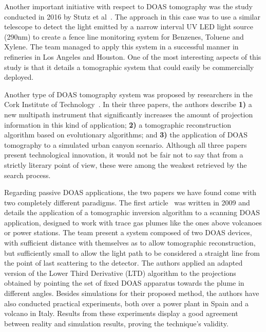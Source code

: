 Another important initiative with respect to \gls{DOAS} tomography was
the study conducted in 2016 by Stutz et al~\cite{Stutz2016}. The
approach in this case was to use a similar telescope to detect the light
emitted by a narrow interval UV LED light source (290nm) to create a
fence line monitoring system for Benzenes, Toluene and Xylene. The team
managed to apply this system in a successful manner in refineries in Los
Angeles and Houston. One of the most interesting aspects of this study
is that it details a tomographic system that could easily be
commercially deployed.

Another type of \gls{DOAS} tomography system was proposed by researchers
in the Cork Institute of Technology~\cite{ODriscoll2003,ODriscoll2003a,
Murphy2003}.  In their three papers, the authors describe \textbf{1)} a
new multipath instrument that significantly increases the amount of
projection information in this kind of application; \textbf{2)} a
tomographic reconstruction algorithm based on evolutionary algorithms;
and \textbf{3)} the application of \gls{DOAS} tomography to a simulated
urban canyon scenario. Although all three papers present technological
innovation, it would not be fair not to say that from a strictly
literary point of view, these were among the weakest retrieved by the
search process.

Regarding passive DOAS applications, the two papers we have found come
with two completely different paradigms. The first
article~\cite{Johansson2009} was written in 2009 and details the
application of a tomographic inversion algorithm to a scanning DOAS
application, designed to work with trace gas plumes like the ones above
volcanoes or power stations. The team present a system composed of two
DOAS devices, with sufficient distance with themselves as to allow
tomographic reconstruction, but sufficiently small to allow the light
path to be considered a straight line from the point of last scattering
to the detector. The authors applied an adapted version of the Lower
Third Derivative (LTD) algorithm to the projections obtained by pointing
the set of fixed DOAS apparatus towards the plume in different angles.
Besides simulations for their proposed method, the authors have also
conducted practical experiments, both over a power plant in Spain and a
volcano in Italy. Results from these experiments display a good
agreement between reality and simulation results, proving the
technique's validity.

